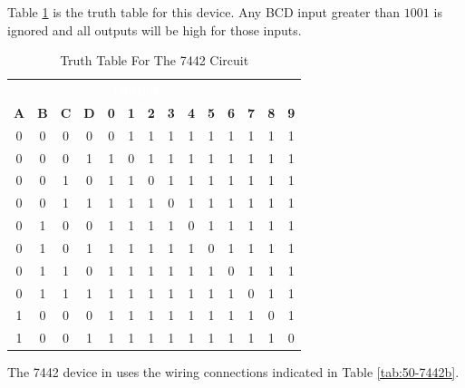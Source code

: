 Table \ref{tab:50-7442a} is the truth table for this device. Any BCD input greater than $ 1001 $ is ignored and all outputs will be high for those inputs.

\begin{table}[H]
	\sffamily
	\newcommand{\head}[1]{\textcolor{white}{\textbf{#1}}}		
	\begin{center}
		\begin{tabular}{cccc | cccccccccc} 
			\rowcolor{black!75}
			\multicolumn{4}{c}{\head{Inputs}} & \multicolumn{10}{c}{\head{Output}} \\
			\textbf{A} & \textbf{B} & \textbf{C} & \textbf{D} & \textbf{0} & \textbf{1} & \textbf{2} & \textbf{3} & \textbf{4} & \textbf{5} & \textbf{6} & \textbf{7} & \textbf{8} & \textbf{9} \\
			\hline
			0 & 0 & 0 & 0  & 0 & 1 & 1 & 1 & 1 & 1 & 1 & 1 & 1 & 1 \\
			0 & 0 & 0 & 1  & 1 & 0 & 1 & 1 & 1 & 1 & 1 & 1 & 1 & 1 \\
			0 & 0 & 1 & 0  & 1 & 1 & 0 & 1 & 1 & 1 & 1 & 1 & 1 & 1 \\
			0 & 0 & 1 & 1  & 1 & 1 & 1 & 0 & 1 & 1 & 1 & 1 & 1 & 1 \\
			0 & 1 & 0 & 0  & 1 & 1 & 1 & 1 & 0 & 1 & 1 & 1 & 1 & 1 \\
			0 & 1 & 0 & 1  & 1 & 1 & 1 & 1 & 1 & 0 & 1 & 1 & 1 & 1 \\
			0 & 1 & 1 & 0  & 1 & 1 & 1 & 1 & 1 & 1 & 0 & 1 & 1 & 1 \\
			0 & 1 & 1 & 1  & 1 & 1 & 1 & 1 & 1 & 1 & 1 & 0 & 1 & 1 \\
			1 & 0 & 0 & 0  & 1 & 1 & 1 & 1 & 1 & 1 & 1 & 1 & 0 & 1 \\
			1 & 0 & 0 & 1  & 1 & 1 & 1 & 1 & 1 & 1 & 1 & 1 & 1 & 0 \\
		\end{tabular}
	\end{center}
	\caption{Truth Table For The 7442 Circuit}
	\label{tab:50-7442a}
\end{table}

The 7442 device in \LE uses the wiring connections indicated in Table \ref{tab:50-7442b}.

